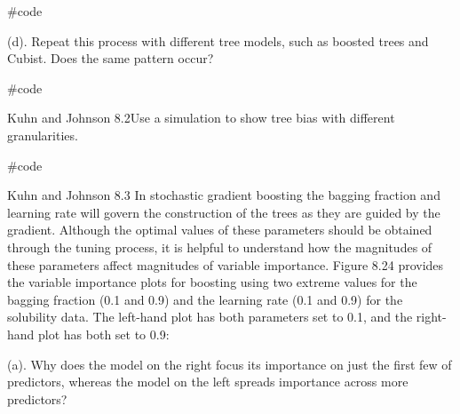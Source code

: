 \documentclass[openany]{report}
\newenvironment{Shaded}{\begin{snugshade}}{\end{snugshade}}
\newcommand{\CommentTok}[1]{\textcolor[rgb]{0.50,0.62,0.50}{#1}}
\begin{document}
\begin{Shaded}
\begin{Highlighting}[]
\CommentTok{#code}
\end{Highlighting}
\end{Shaded}

\begin{subquestion}{(d).} Repeat this process with different tree models, such as boosted trees and Cubist. Does the same pattern occur?\end{subquestion}

\begin{Shaded}
\begin{Highlighting}[]
\CommentTok{#code}
\end{Highlighting}
\end{Shaded}


\begin{question}{Kuhn and Johnson 8.2}Use a simulation to show tree bias with different granularities.\end{question}

\begin{Shaded}
\begin{Highlighting}[]
\CommentTok{#code}
\end{Highlighting}
\end{Shaded}


\begin{question}{Kuhn and Johnson 8.3} In stochastic gradient boosting the bagging fraction and learning rate will govern the construction of the trees as they are guided by the gradient. Although the optimal values of these parameters should be obtained through the tuning process, it is helpful to understand how the magnitudes of these parameters affect magnitudes of variable importance. Figure 8.24 provides the variable importance plots for boosting using two extreme values for the bagging fraction (0.1 and 0.9) and the learning rate (0.1 and 0.9) for the solubility data. The left-hand plot has both parameters set to 0.1, and the right-hand plot has both set to 0.9: \end{question}

\begin{subquestion}{(a).} Why does the model on the right focus its importance on just the first few of predictors, whereas the model on the left spreads importance across more predictors? \end{subquestion}
\end{document}
